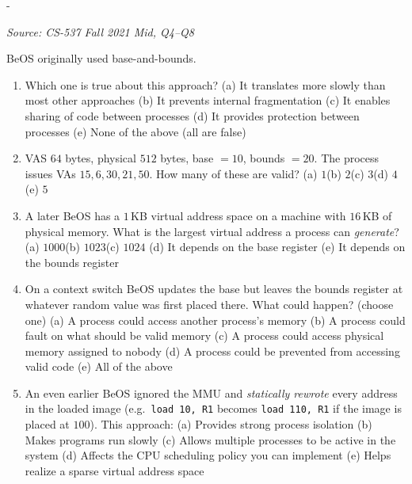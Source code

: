 \documentclass[11pt,a4paper]{article}
\makeatletter
\newcommand{\keepspace}[1]{\par\penalty-100\begingroup
  \setlength{\dimen@}{#1}\dimen@ii\pagegoal\advance\dimen@ii-\pagetotal
  \ifdim\dimen@>\dimen@ii\ifdim\dimen@ii>\z@\vfil\fi\break\fi\endgroup}
\newcounter{qn}[section]
\newenvironment{Qn}[4]{%
  \refstepcounter{qn}\keepspace{7\baselineskip}%
  \begin{tcolorbox}[qboxstyle, title={Q\thesection.\theqn\ \ [#1 \textbar\ #2]\ \ #4}]%
  {\footnotesize\color{g3}\textit{Source: #3}}\par\smallskip%
}{%
  \end{tcolorbox}%
}
\makeatother
\begin{document}
\begin{Qn}{Medium}{Lect 9}{CS-537 Fall 2021 Mid, Q4--Q8}{BeOS: base-and-bounds protection, bounds-on-switch, static relocation}
BeOS originally used base-and-bounds.
\begin{enumerate}
  \item[4.] Which one is true about this approach?
        (a) It translates more slowly than most other approaches\quad
        (b) It prevents internal fragmentation\quad
        (c) It enables sharing of code between processes\quad
        (d) It provides protection between processes\quad
        (e) None of the above (all are false)
  \item[5.] VAS $64$ bytes, physical $512$ bytes, base $=10$,
        bounds $=20$. The process issues VAs $15,6,30,21,50$. How
        many of these are valid?
        (a) $1$\quad (b) $2$\quad (c) $3$\quad (d) $4$\quad (e) $5$
  \item[6.] A later BeOS has a $1$\,KB virtual address space on a
        machine with $16$\,KB of physical memory. What is the largest
        virtual address a process can \emph{generate}?
        (a) $1000$\quad (b) $1023$\quad (c) $1024$\quad
        (d) It depends on the base register\quad
        (e) It depends on the bounds register
  \item[7.] On a context switch BeOS updates the base but leaves the
        bounds register at whatever random value was first placed
        there. What could happen? (choose one)
        (a) A process could access another process's memory\quad
        (b) A process could fault on what should be valid memory\quad
        (c) A process could access physical memory assigned to nobody\quad
        (d) A process could be prevented from accessing valid code\quad
        (e) All of the above
  \item[8.] An even earlier BeOS ignored the MMU and \emph{statically
        rewrote} every address in the loaded image (e.g.\
        \texttt{load 10, R1} becomes \texttt{load 110, R1} if the
        image is placed at $100$). This approach:
        (a) Provides strong process isolation\quad
        (b) Makes programs run slowly\quad
        (c) Allows multiple processes to be active in the system\quad
        (d) Affects the CPU scheduling policy you can implement\quad
        (e) Helps realize a sparse virtual address space
\end{enumerate}
\end{Qn}
\end{document}
